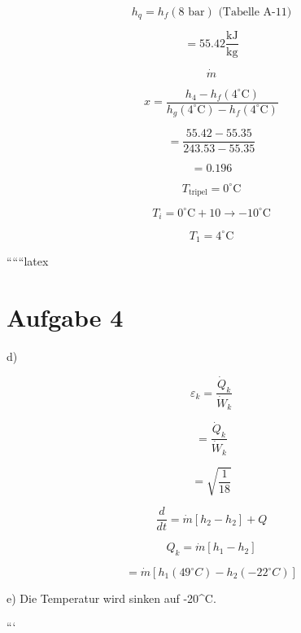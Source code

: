 \[
h_{q} = h_{f}(8 \text{ bar}) \text{ (Tabelle A-11)}
\]

\[
= 55.42 \frac{\text{kJ}}{\text{kg}}
\]

\[
\dot{m}
\]

\[
x = \frac{h_{4} - h_{f}(4^\circ \text{C})}{h_{g}(4^\circ \text{C}) - h_{f}(4^\circ \text{C})}
\]

\[
= \frac{55.42 - 55.35}{243.53 - 55.35}
\]

\[
= 0.196
\]

\[
T_{\text{tripel}} = 0^\circ \text{C}
\]

\[
T_i = 0^\circ \text{C} + 10 \rightarrow -10^\circ \text{C}
\]

\[
T_1 = 4^\circ \text{C}
\]


``````latex


\section*{Aufgabe 4}

d)

\[
\varepsilon_k = \frac{\dot{Q}_k}{\dot{W}_k}
\]

\[
= \frac{\dot{Q}_k}{\dot{W}_k}
\]

\[
= \sqrt{\frac{1}{18}}
\]

\[
\frac{d}{dt} = \dot{m} \left[ h_2 - h_2 \right] + Q
\]

\[
Q_k = \dot{m} \left[ h_1 - h_2 \right]
\]

\[
= \dot{m} \left[ h_1 (49^\circ C) - h_2 (-22^\circ C) \right]
\]

e) Die Temperatur wird sinken auf -20^\circ C.

```